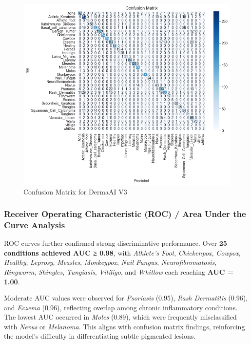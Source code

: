 \documentclass[
  12pt,
  oneside]{article}
\begin{document}
\begin{figure}

{\centering \includegraphics[width=1\linewidth]{confusion_matrix} 

}

\caption{Confusion Matrix for DermaAI V3}\label{fig:unnamed-chunk-18}
\end{figure}

\subsubsection{Receiver Operating Characteristic (ROC) / Area Under the
Curve
Analysis}\label{receiver-operating-characteristic-roc-area-under-the-curve-analysis}

ROC curves further confirmed strong discriminative performance. Over
\textbf{25 conditions achieved AUC ≥ 0.98}, with \emph{Athlete's Foot},
\emph{Chickenpox}, \emph{Cowpox}, \emph{Healthy}, \emph{Leprosy},
\emph{Measles}, \emph{Monkeypox}, \emph{Nail Fungus},
\emph{Neurofibromatosis}, \emph{Ringworm}, \emph{Shingles},
\emph{Tungiasis}, \emph{Vitiligo}, and \emph{Whitlow} each reaching
\textbf{AUC = 1.00}.

Moderate AUC values were observed for \emph{Psoriasis} (0.95),
\emph{Rash Dermatitis} (0.96), and \emph{Eczema} (0.96), reflecting
overlap among chronic inflammatory conditions. The lowest AUC occurred
in \emph{Moles} (0.89), which were frequently misclassified with
\emph{Nevus} or \emph{Melanoma}. This aligns with confusion matrix
findings, reinforcing the model's difficulty in differentiating subtle
pigmented lesions.
\end{document}
